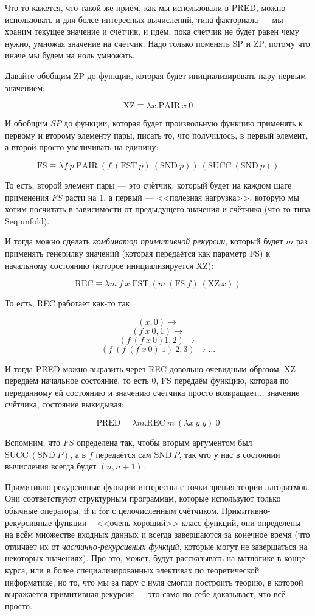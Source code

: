 \documentclass{../../text-style}
\begin{document}
Что-то кажется, что такой же приём, как мы использовали в PRED, можно использовать и для более интересных вычислений, типа факториала --- мы храним текущее значение и счётчик, и идём, пока счётчик не будет равен чему нужно, умножая значение на счётчик. Надо только поменять SP и ZP, потому что иначе мы будем на ноль умножать.

Давайте обобщим ZP до функции, которая будет инициализировать пару первым значением:

$$\mbox{XZ} \equiv \lambda x.\mbox{PAIR}\ x\ 0$$

И обобщим $SP$ до функции, которая будет произвольную функцию применять к первому и второму элементу пары, писать то, что получилось, в первый элемент, а второй просто увеличивать на единицу:

$$\mbox{FS} \equiv \lambda f\ p.\mbox{PAIR}\ (f\ (\mbox{FST}\ p)\ (\mbox{SND}\ p))\ (\mbox{SUCC}\ (\mbox{SND}\ p))$$

То есть, второй элемент пары --- это счётчик, который будет на каждом шаге применения $FS$ расти на 1, а первый --- <<полезная нагрузка>>, которую мы хотим посчитать в зависимости от предыдущего значения и счётчика (что-то типа Seq.unfold).

И тогда можно сделать \textit{комбинатор примитивной рекурсии}, который будет $m$ раз применять генерилку значений (которая передаётся как параметр FS) к начальному состоянию (которое инициализируется XZ):

$$\mbox{REC} \equiv \lambda m\ f\ x.\mbox{FST}\ (m\ (\mbox{FS}\ f)\ (\mbox{XZ}\ x))$$

То есть, REC работает как-то так:

$$(x, 0) \rightarrow$$
$$(f\ x\ 0, 1) \rightarrow$$
$$(f\ (f\ x\ 0) 1, 2) \rightarrow$$
$$(f\ (f\ (f\ x\ 0)\ 1)\ 2, 3) \rightarrow ...$$

И тогда PRED можно выразить через REC довольно очевидным образом. XZ передаём начальное состояние, то есть 0, FS передаём функцию, которая по переданному ей состоянию и значению счётчика просто возвращает... значение счётчика, состояние выкидывая:

$$\mbox{PRED} = \lambda m.\mbox{REC}\ m\ (\lambda x\ y.y)\ 0$$

Вспомним, что $FS$ определена так, чтобы вторым аргументом был $\mbox{SUCC}\ (\mbox{SND}\ P)$, а в $f$ передаётся сам $\mbox{SND}\ P$, так что у нас в состоянии вычисления всегда будет $(n, n + 1)$.

Примитивно-рекурсивные функции интересны с точки зрения теории алгоритмов. Они соответствуют структурным программам, которые используют только обычные операторы, if и for с целочисленным счётчиком. Примитивно-рекурсивные функции -- <<очень хороший>> класс функций, они определены на всём множестве входных данных и всегда завершаются за конечное время (что отличает их от \textit{частично-рекурсивных функций}, которые могут не завершаться на некоторых значениях). Про это, может, будут рассказывать на матлогике в конце курса, или в более специализированных элективах по теоретической информатике, но то, что мы за пару с нуля смогли построить теорию, в которой выражается примитивная рекурсия --- это само по себе доказывает, что всё просто.
\end{document}
